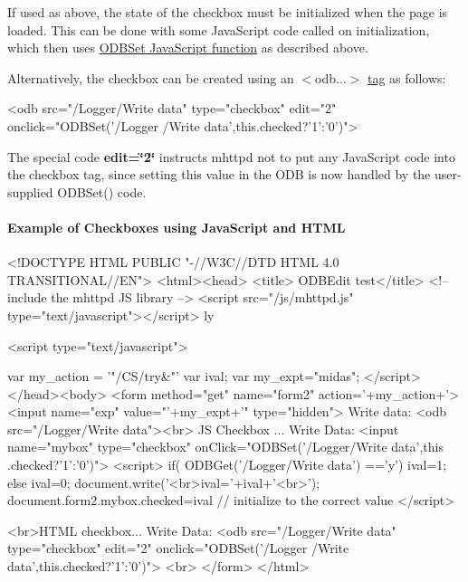 If used as above, the state of the checkbox must be initialized when the page is loaded. This can be done with some JavaScript code called on initialization, which then uses \hyperlink{RC_mhttpd_custom_ODB_access_RC_mhttpd_custom_odbset}{ODBSet JavaScript function} as described above.

Alternatively, the checkbox can be created using an  $<$odb...$>$  \hyperlink{RC_mhttpd_custom_ODB_access_RC_mhttpd_custom_odb_html}{tag} as follows: 
\begin{DoxyCode}
  <odb src="/Logger/Write data" type="checkbox" edit="2" onclick="ODBSet('/Logger
      /Write data',this.checked?'1':'0')">
\end{DoxyCode}


The special code {\bfseries edit=\char`\"{}2\char`\"{}} instructs mhttpd not to put any JavaScript code into the checkbox tag, since setting this value in the ODB is now handled by the user-\/supplied ODBSet() code.\hypertarget{RC_mhttpd_custom_ODB_access_features_RC_mhttpd_js_example_3}{}\paragraph{Example of Checkboxes using JavaScript and HTML}\label{RC_mhttpd_custom_ODB_access_features_RC_mhttpd_js_example_3}

\begin{DoxyCode}
<!DOCTYPE HTML PUBLIC "-//W3C//DTD HTML 4.0 TRANSITIONAL//EN">
<html><head>
<title> ODBEdit test</title>
<!-- include the mhttpd JS library -->
\htmlonly <script src="/js/mhttpd.js" type="text/javascript"></script> \endhtmlon
      ly

\htmlonly <script type="text/javascript">

var my_action = '"/CS/try&"'
var ival;
var my_expt="midas";
</script> \endhtmlonly
</head><body>
<form method="get" name="form2" action='+my_action+'>
<input name="exp" value="'+my_expt+'" type="hidden">
Write data: <odb src="/Logger/Write data"><br>
JS Checkbox ... Write Data:
<input  name="mybox"  type="checkbox"   onClick="ODBSet('/Logger/Write data',this
      .checked?'1':'0')">
\htmlonly <script>
if( ODBGet('/Logger/Write data') =='y')
  ival=1;
else
  ival=0;
document.write('<br>ival='+ival+'<br>');
document.form2.mybox.checked=ival  // initialize to the correct value
</script> \endhtmlonly

<br>HTML checkbox... Write Data:
  <odb src="/Logger/Write data" type="checkbox" edit="2" onclick="ODBSet('/Logger
      /Write data',this.checked?'1':'0')">
<br>
</form>
</html>
\end{DoxyCode}


